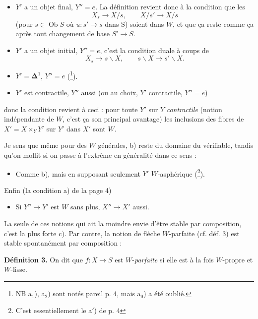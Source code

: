 \documentclass[11pt]{article}
\newcommand{\printedpage}[1]{\marginpar{\footnotesize p.~#1}}
\newcommand{\msp}[1]{\marginpar{\footnotesize [#1]}}
\newcommand{\Ob}{\operatorname{Ob}}
\newcommand{\fl}{\longrightarrow}
\begin{document}
\begin{itemize}
\item[a$_1$)] \msp{page 39}$Y'$ a un objet final, $Y''=e$. La définition revient donc à la condition que les
\[ X_s\fl X/s, \qquad X/s'\fl X/s \]
(pour $s\in\Ob S$ où $u : s'\fl s$ dans $\mathrm{S}$) soient dans $W$, et que ça reste comme ça après tout changement de base $S'\fl S$.

\item[a$_2$)] $Y'$ a un objet initial, $Y''=e$, c'est la condition duale à coups de
\[ X_s\fl s\backslash X, \qquad s\backslash X\fl s'\backslash X. \]

\item[a$_0$)] $Y'=\boldsymbol{\Delta}^1$, $Y''=e$ (\footnote[46]{NB a$_1$), a$_2$) sont notés pareil p. 4, mais a$_0$) a été oublié.}).

\item[b)] $Y'$ est contractile, $Y''$ aussi (ou au choix, $Y'$ contractile, $Y''=e$)
\end{itemize}

donc la condition revient à ceci : pour toute $Y'$ sur $Y$ \textit{contractile} (notion indépendante de $W$, c'est ça son principal avantage) les inclusions des fibres de $X'=X\times_Y Y'$ sur $Y'$ dans $X'$ sont $W$.

Je sens que même pour des $W$ générales, b) reste du domaine du vérifiable, tandis qu'on mollit si on passe à l'extrême en généralité dans ce sens :

\begin{itemize}
\item[b$'$)] Comme b), mais en supposant seulement $Y'$ $W$-asphérique (\footnote[47]{C'est essentiellement le a$'$) de p. 4}).
\end{itemize}

Enfin (la condition a) de la page 4)

\begin{itemize}
\item[c)] Si $Y''\fl Y'$ est $W$ sans plus, $X''\fl X'$ aussi.
\end{itemize}

\printedpage{30}
\msp{page 40}La seule de ces notions qui ait la moindre envie d'être stable par composition, c'est la plus forte c). Par contre, la notion de flèche $W$-parfaite (cf. déf. 3) est stable spontanément par composition :

\textbf{Définition 3.} On dit que $f : X\fl S$ est $W$-\textit{parfaite} si elle est à la fois $W$-propre et $W$-lisse.
\end{document}

